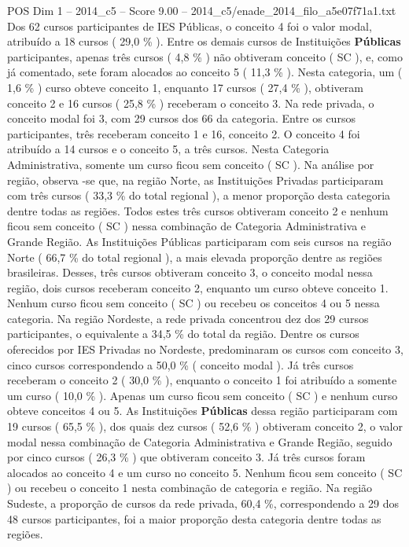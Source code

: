 \begin{textsample}{POS Dim 1 – 2014\_c5 – Score 9.00 – 2014\_c5/enade\_2014\_filo\_a5e07f71a1.txt}
Dos 62 cursos participantes de IES Públicas, o conceito 4 foi o valor modal, atribuído a 18 cursos ( 29,0 \% ).
Entre os demais cursos de Instituições \textbf{Públicas} participantes, apenas três cursos ( 4,8 \% ) não obtiveram conceito ( SC ), e, como já comentado, sete foram alocados ao conceito 5 ( 11,3 \% ).
Nesta categoria, um ( 1,6 \% ) curso obteve conceito 1, enquanto 17 cursos ( 27,4 \% ), obtiveram conceito 2 e 16 cursos ( 25,8 \% ) receberam o conceito 3.
Na rede privada, o conceito modal foi 3, com 29 cursos dos 66 da categoria.
Entre os cursos participantes, três receberam conceito 1 e 16, conceito 2.
O conceito 4 foi atribuído a 14 cursos e o conceito 5, a três cursos.
Nesta Categoria Administrativa, somente um curso ficou sem conceito ( SC ).
Na análise por região, observa -se que, na região Norte, as Instituições Privadas participaram com três cursos ( 33,3 \% do total regional ), a menor proporção desta categoria dentre todas as regiões.
Todos estes três cursos obtiveram conceito 2 e nenhum ficou sem conceito ( SC ) nessa combinação de Categoria Administrativa e Grande Região.
As Instituições Públicas participaram com seis cursos na região Norte ( 66,7 \% do total regional ), a mais elevada proporção dentre as regiões brasileiras.
Desses, três cursos obtiveram conceito 3, o conceito modal nessa região, dois cursos receberam conceito 2, enquanto um curso obteve conceito 1.
Nenhum curso ficou sem conceito ( SC ) ou recebeu os conceitos 4 ou 5 nessa categoria.
Na região Nordeste, a rede privada concentrou dez dos 29 cursos participantes, o equivalente a 34,5 \% do total da região.
Dentre os cursos oferecidos por IES Privadas no Nordeste, predominaram os cursos com conceito 3, cinco cursos correspondendo a 50,0 \% ( conceito modal ).
Já três cursos receberam o conceito 2 ( 30,0 \% ), enquanto o conceito 1 foi atribuído a somente um curso ( 10,0 \% ).
Apenas um curso ficou sem conceito ( SC ) e nenhum curso obteve conceitos 4 ou 5.
As Instituições \textbf{Públicas} dessa região participaram com 19 cursos ( 65,5 \% ), dos quais dez cursos ( 52,6 \% ) obtiveram conceito 2, o valor modal nessa combinação de Categoria Administrativa e Grande Região, seguido por cinco cursos ( 26,3 \% ) que obtiveram conceito 3.
Já três cursos foram alocados ao conceito 4 e um curso no conceito 5.
Nenhum ficou sem conceito ( SC ) ou recebeu o conceito 1 nesta combinação de categoria e região.
Na região Sudeste, a proporção de cursos da rede privada, 60,4 \%, correspondendo a 29 dos 48 cursos participantes, foi a maior proporção desta categoria dentre todas as regiões.

\end{textsample}
